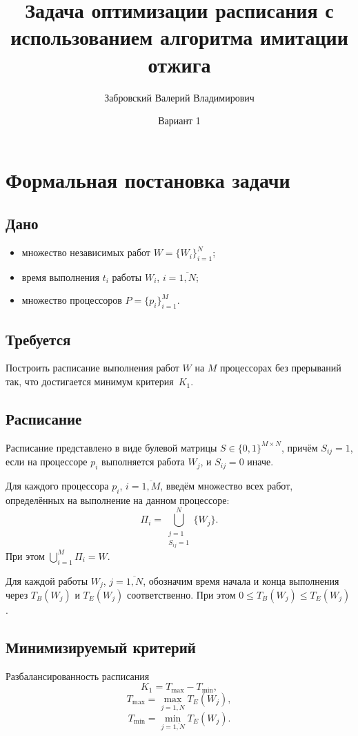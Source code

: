 \documentclass[12pt]{article}
\title{Задача оптимизации расписания с использованием алгоритма имитации отжига}
\author{Забровский Валерий Владимирович}
\date{Вариант 1}
\begin{document}
\maketitle

\section*{Формальная постановка задачи}

\subsection*{Дано}
\begin{itemize}
    \item множество независимых работ $W = \{W_i\}_{i=1}^{N}$;
    \item время выполнения $t_i$ работы $W_i$, $i = \overline{1, N}$;
    \item множество процессоров $P = \{p_i\}_{i=1}^{M}$.
\end{itemize}

\subsection*{Требуется}
Построить расписание выполнения работ $W$ на $M$ процессорах без прерываний так,
что достигается минимум критерия~\hyperref[crit]{$K_1$}.

\subsection*{Расписание}

Расписание представлено в виде булевой матрицы $S \in \{0, 1\}^{M \times N}$,
причём $S_{ij} = 1$, если на процессоре $p_i$ выполняется работа $W_j$,
и $S_{ij} = 0$ иначе.

Для каждого процессора $p_i$, $i = \overline{1, M}$, введём множество
всех работ, определённых на выполнение на данном процессоре:
\begin{equation}
    \Pi_i = \bigcup\limits_{\substack{j=1 \\ S_{ij}=1}}^N \{W_j\}.
\end{equation}
При этом $\bigcup\limits_{i=1}^M \Pi_i = W$.

Для каждой работы $W_j$, $j = \overline{1, N}$, обозначим время начала и конца
выполнения через $T_B(W_j)$ и $T_E(W_j)$ соответственно.
При этом $0 \leq T_B(W_j) \leq T_E(W_j)$.

\subsection*{Минимизируемый критерий}
\label{crit}
Разбалансированность расписания
\begin{equation}
    K_1 = T_{\max} - T_{\min},
\end{equation}
\begin{equation}
    T_{\max} = \max_{j = \overline{1, N}} T_E(W_j),
\end{equation}
\begin{equation}
    T_{\min} = \min_{j = \overline{1, N}} T_E(W_j).
\end{equation}
\end{document}

